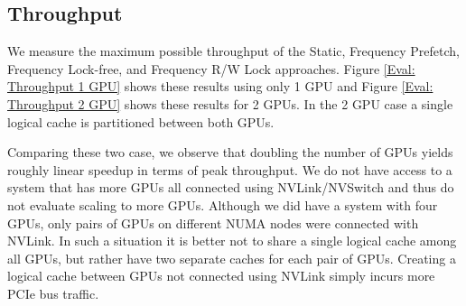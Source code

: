\subsection{Throughput}
We measure the maximum possible throughput of the Static, Frequency Prefetch, Frequency Lock-free, and Frequency R/W Lock approaches.
Figure \ref{Eval: Throughput 1 GPU} shows these results using only 1 GPU and Figure \ref{Eval: Throughput 2 GPU} shows these results for 2 GPUs. In the 2 GPU case a single logical cache is partitioned between both GPUs.  

Comparing these two case, we observe that doubling the number of GPUs yields roughly linear speedup in terms of peak throughput. We do not have access to a system that has more GPUs all connected using NVLink/NVSwitch and thus do not evaluate scaling to more GPUs. Although we did have a system with four GPUs, only pairs of GPUs on different NUMA nodes were connected with NVLink. In such a situation it is better not to share a single logical cache among all GPUs, but rather have two separate caches for each pair of GPUs. Creating a logical cache between GPUs not connected using NVLink simply incurs more PCIe bus traffic.
